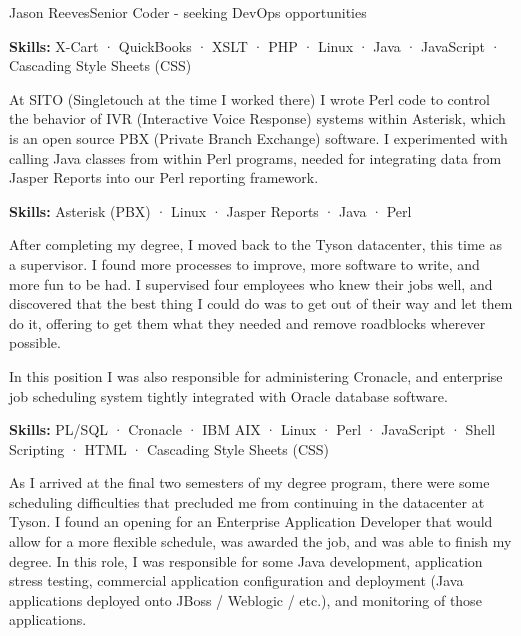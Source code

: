\documentclass{article}
\begin{document}
\begin{cv}[avatar]{Jason Reeves}{Senior Coder - seeking DevOps opportunities}
\begin{cvevent}[Feb 2009][Jul 2011]
  \vspace*{3mm}
  \textbf{Skills:} X-Cart · QuickBooks · XSLT · PHP · Linux · Java · JavaScript · Cascading Style Sheets (CSS)
  \vspace*{5mm}
\end{cvevent}

\begin{cvevent}[Sep 2007][Feb 2009]
  At SITO (Singletouch at the time I worked there) I wrote Perl code to control the behavior of IVR (Interactive Voice Response) systems within Asterisk, which is an open source PBX (Private Branch Exchange) software. I experimented with calling Java classes from within Perl programs, needed for integrating data from Jasper Reports into our Perl reporting framework.
  
  \vspace*{3mm}
  \textbf{Skills:} Asterisk (PBX) · Linux · Jasper Reports · Java · Perl
  \vspace*{5mm}
\end{cvevent}

\begin{cvevent}[Sep 2005][Sep 2007]
  After completing my degree, I moved back to the Tyson datacenter, this time as a supervisor. I found more processes to improve, more software to write, and more fun to be had. I supervised four employees who knew their jobs well, and discovered that the best thing I could do was to get out of their way and let them do it, offering to get them what they needed and remove roadblocks wherever possible.
  \vspace*{3mm}
  
  In this position I was also responsible for administering Cronacle, and enterprise job scheduling system tightly integrated with Oracle database software.
  \vspace*{3mm}
  
  \textbf{Skills:} PL/SQL · Cronacle · IBM AIX · Linux · Perl · JavaScript · Shell Scripting · HTML · Cascading Style Sheets (CSS)
  \vspace*{5mm}
\end{cvevent}

\begin{cvevent}[Sep 2004][Sep 2005]
  As I arrived at the final two semesters of my degree program, there were some scheduling difficulties that precluded me from continuing in the datacenter at Tyson. I found an opening for an Enterprise Application Developer that would allow for a more flexible schedule, was awarded the job, and was able to finish my degree. In this role, I was responsible for some Java development, application stress testing, commercial application configuration and deployment (Java applications deployed onto JBoss / Weblogic / etc.), and monitoring of those applications.
  \vspace*{3mm}
  

\end{cvevent}
\end{cv}
\end{document}
